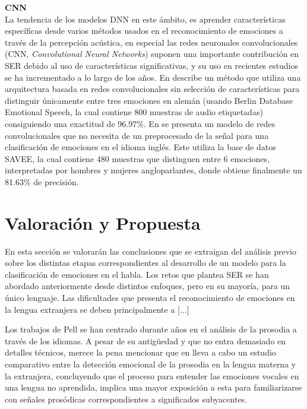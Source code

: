 \documentclass[11pt,a4paper,spanish]{book}
\begin{document}
	\textbf{CNN}\\
	La tendencia de los modelos DNN en este ámbito, es aprender características específicas desde varios métodos usados en el reconocimiento de emociones a través de la percepción acústica, en especial las redes neuronales convolucionales (CNN, \emph{Convolutional Neural Networks}) suponen una importante contribución en SER debido al uso de características significativas, y su uso en recientes estudios se ha incrementado a lo largo de los años.
	En \cite{Harar2017} describe un método que utiliza una arquitectura basada en redes convolucionales sin selección de características para distinguir únicamente entre tres emociones en alemán (usando Berlin Database Emotional Speech, la cual contiene 800 muestras de audio etiquetadas) consiguiendo una exactitud de 96.97\%. En \cite{AbdulQayyum2019} se presenta un modelo de redes convolucionales que no necesita de un preprocesado de la señal para una clasificación de emociones en el idioma inglés. Este utiliza la base de datos SAVEE, la cual contiene 480 muestras que distinguen entre 6 emociones, interpretadas por hombres y mujeres angloparlantes, donde obtiene finalmente un 81.63\% de precisión.\newline
	
	\section{Valoración y Propuesta}
	En esta sección se valorarán las conclusiones que se extraigan del análisis previo sobre los distintas etapas correspondientes al desarrollo de un modelo para la clasificación de emociones en el habla. Los retos que plantea SER se han abordado anteriormente desde distintos enfoques, pero en su mayoría, para un único lenguaje. Las dificultades que presenta el reconocimiento de emociones en la lengua extranjera se deben principalmente a [...]\hfill \break
	
	Los trabajos de Pell se han centrado durante años en el análisis de la prosodia a través de los idiomas. A pesar de su antigüedad y que no entra demasiado en detalles técnicos, merece la pena mencionar que en \cite{Pell2008} lleva a cabo un estudio comparativo entre la detección emocional de la prosodia en la lengua materna y la extranjera, concluyendo que el proceso para entender las emociones vocales en una lengua no aprendida, implica una mayor exposición a esta para familiarizarse con señales prosódicas correspondientes a significados subyacentes.\\
	
\end{document}
